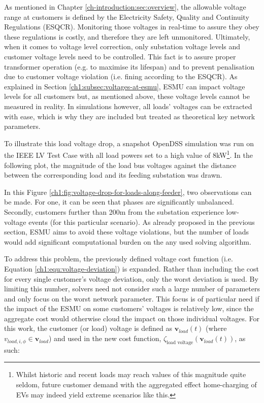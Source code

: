 As mentioned in Chapter \ref{ch-introduction:sec:overview}, the allowable voltage range at customers is defined by the Electricity Safety, Quality and Continuity Regulations (ESQCR).
Monitoring those voltages in real-time to assure they obey these regulations is costly, and therefore they are left unmonitored.
Ultimately, when it comes to voltage level correction, only substation voltage levels and customer voltage levels need to be controlled.
This fact is to assure proper transformer operation (e.g. to maximise its lifespan) and to prevent penalisation due to customer voltage violation (i.e. fining according to the ESQCR).
As explained in Section \ref{ch1:subsec:voltages-at-esmu}, ESMU can impact voltage levels for all customers but, as mentioned above, these voltage levels cannot be measured in reality.
In simulations however, all loads' voltages can be extracted with ease, which is why they are included but treated as theoretical key network parameters.

To illustrate this load voltage drop, a snapshot OpenDSS simulation was run on the IEEE LV Test Case with all load powers set to a high value of 8kW\footnote[1]{Whilst historic and recent loads may reach values of this magnitude quite seldom, future customer demand with the aggregated effect home-charging of EVs may indeed yield extreme scenarios like this.}.
In the following plot, the magnitude of the load bus voltages against the distance between the corresponding load and its feeding substation was drawn.



In this Figure \ref{ch1:fig:voltage-drop-for-loads-along-feeder}, two observations can be made.
For one, it can be seen that phases are significantly unbalanced.
Secondly, customers further than 200m from the substation experience low-voltage events (for this particular scenario).
As already proposed in the previous section, ESMU aims to avoid these voltage violations, but the number of loads would add significant computational burden on the any used solving algorithm.

To address this problem, the previously defined voltage cost function (i.e. Equation \ref{ch1:equ:voltage-deviation}) is expanded.
Rather than including the cost for every single customer's voltage deviation, only the worst deviation is used.
By limiting this number, solvers need not consider such a large number of parameters and only focus on the worst network parameter.
This focus is of particular need if the impact of the ESMU on some customers' voltages is relatively low, since the aggregate cost would otherwise cloud the impact on those individual voltages.
For this work, the customer (or load) voltage is defined as $\textbf{v}_{load}(t)$ (where $v_{load,i,\phi} \in \textbf{v}_{load}$) and used in the new cost function, $\zeta_\text{load voltage}(\textbf{v}_{load}(t))$, as such:

